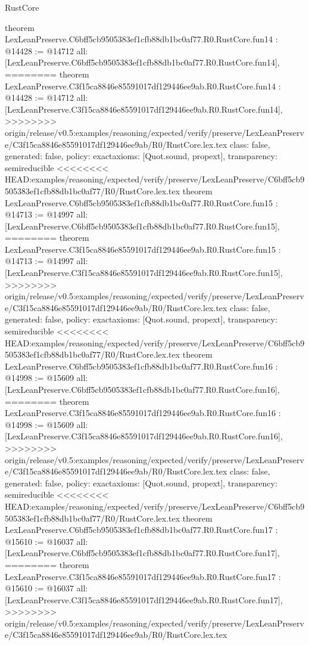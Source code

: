 \begin{lexlean}{RustCore}
\begin{coremodule}
{\begin{coremodule}
{{{{{{{{{{{{{{{{theorem LexLeanPreserve.C6bff5cb9505383ef1cfb88db1bc0af77.R0.RustCore.fun14 : @14428 := @14712 {
  all: [LexLeanPreserve.C6bff5cb9505383ef1cfb88db1bc0af77.R0.RustCore.fun14],
========
theorem LexLeanPreserve.C3f15ca8846e85591017df129446ee9ab.R0.RustCore.fun14 : @14428 := @14712 {
  all: [LexLeanPreserve.C3f15ca8846e85591017df129446ee9ab.R0.RustCore.fun14],
>>>>>>>> origin/release/v0.5:examples/reasoning/expected/verify/preserve/LexLeanPreserve/C3f15ca8846e85591017df129446ee9ab/R0/RustCore.lex.tex
  class: false,
  generated: false,
  policy: exact{axioms: [Quot.sound, propext]},
  transparency: semireducible
}
<<<<<<<< HEAD:examples/reasoning/expected/verify/preserve/LexLeanPreserve/C6bff5cb9505383ef1cfb88db1bc0af77/R0/RustCore.lex.tex
theorem LexLeanPreserve.C6bff5cb9505383ef1cfb88db1bc0af77.R0.RustCore.fun15 : @14713 := @14997 {
  all: [LexLeanPreserve.C6bff5cb9505383ef1cfb88db1bc0af77.R0.RustCore.fun15],
========
theorem LexLeanPreserve.C3f15ca8846e85591017df129446ee9ab.R0.RustCore.fun15 : @14713 := @14997 {
  all: [LexLeanPreserve.C3f15ca8846e85591017df129446ee9ab.R0.RustCore.fun15],
>>>>>>>> origin/release/v0.5:examples/reasoning/expected/verify/preserve/LexLeanPreserve/C3f15ca8846e85591017df129446ee9ab/R0/RustCore.lex.tex
  class: false,
  generated: false,
  policy: exact{axioms: [Quot.sound, propext]},
  transparency: semireducible
}
<<<<<<<< HEAD:examples/reasoning/expected/verify/preserve/LexLeanPreserve/C6bff5cb9505383ef1cfb88db1bc0af77/R0/RustCore.lex.tex
theorem LexLeanPreserve.C6bff5cb9505383ef1cfb88db1bc0af77.R0.RustCore.fun16 : @14998 := @15609 {
  all: [LexLeanPreserve.C6bff5cb9505383ef1cfb88db1bc0af77.R0.RustCore.fun16],
========
theorem LexLeanPreserve.C3f15ca8846e85591017df129446ee9ab.R0.RustCore.fun16 : @14998 := @15609 {
  all: [LexLeanPreserve.C3f15ca8846e85591017df129446ee9ab.R0.RustCore.fun16],
>>>>>>>> origin/release/v0.5:examples/reasoning/expected/verify/preserve/LexLeanPreserve/C3f15ca8846e85591017df129446ee9ab/R0/RustCore.lex.tex
  class: false,
  generated: false,
  policy: exact{axioms: [Quot.sound, propext]},
  transparency: semireducible
}
<<<<<<<< HEAD:examples/reasoning/expected/verify/preserve/LexLeanPreserve/C6bff5cb9505383ef1cfb88db1bc0af77/R0/RustCore.lex.tex
theorem LexLeanPreserve.C6bff5cb9505383ef1cfb88db1bc0af77.R0.RustCore.fun17 : @15610 := @16037 {
  all: [LexLeanPreserve.C6bff5cb9505383ef1cfb88db1bc0af77.R0.RustCore.fun17],
========
theorem LexLeanPreserve.C3f15ca8846e85591017df129446ee9ab.R0.RustCore.fun17 : @15610 := @16037 {
  all: [LexLeanPreserve.C3f15ca8846e85591017df129446ee9ab.R0.RustCore.fun17],
>>>>>>>> origin/release/v0.5:examples/reasoning/expected/verify/preserve/LexLeanPreserve/C3f15ca8846e85591017df129446ee9ab/R0/RustCore.lex.tex
}}}}}}}}}}}}}}}}}}}}}
\end{coremodule}}
\end{coremodule}
\end{lexlean}
